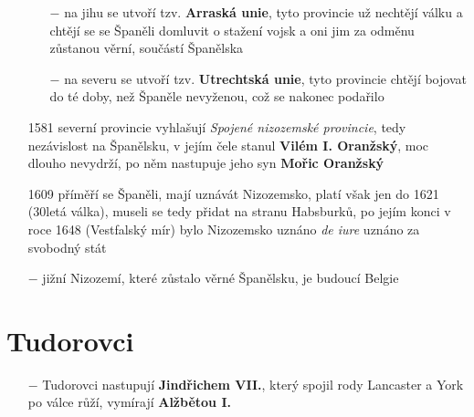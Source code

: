 \documentclass{article}
\begin{document}
\begin{itemize}
    \begin{itemize}
        \vspace{-0.5em}
        \setlength\itemsep{0.15em}
        \item[$-$] na jihu se utvoří tzv. \textbf{Arraská unie}, tyto provincie už nechtějí válku a chtějí se se Španěli domluvit o stažení vojsk a oni jim za odměnu zůstanou věrní, součástí Španělska
        \item[$-$] na severu se utvoří tzv. \textbf{Utrechtská unie}, tyto provincie chtějí bojovat do té doby, než Španěle nevyženou, což se nakonec podařilo
    \end{itemize}
    \item[1581] severní provincie vyhlašují \textit{Spojené nizozemské provincie}, tedy nezávislost na Španělsku, v jejím čele stanul \textbf{Vilém I. Oranžský}, moc dlouho nevydrží, po něm nastupuje jeho syn \textbf{Mořic Oranžský}
    \item[1609] příměří se Španěli, mají uznávát Nizozemsko, platí však jen do 1621 (30letá válka), museli se tedy přidat na stranu Habsburků, po jejím konci v roce 1648 (Vestfalský mír) bylo Nizozemsko uznáno \textit{de iure} uznáno za svobodný stát
    \item[$-$] jižní Nizozemí, které zůstalo věrné Španělsku, je budoucí Belgie
\end{itemize}

\section*{Tudorovci}

\begin{itemize}
    \vspace{-0.5em}
    \setlength\itemsep{0.15em}
    \item[$-$] Tudorovci nastupují \textbf{Jindřichem VII.}, který spojil rody Lancaster a York po válce růží, vymírají \textbf{Alžbětou I.}
\end{itemize}
\end{document}
